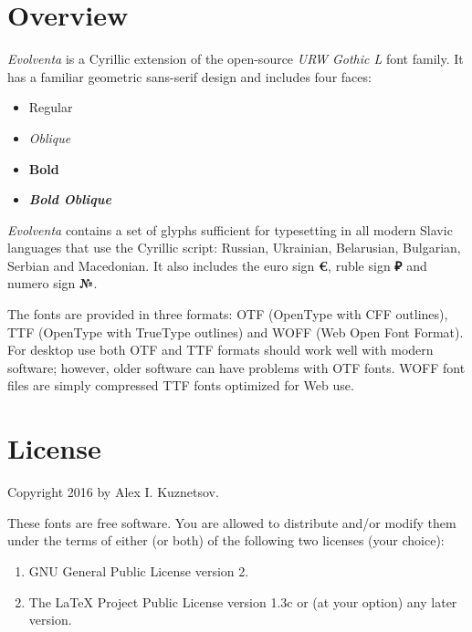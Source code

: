 \documentclass[a4paper,12pt,oneside,extrafontsizes]{memoir}
\begin{document}


\chapter{Overview}

\emph{Evolventa} is a Cyrillic extension of the open-source \emph{URW Gothic L} font family. It has a familiar geometric sans-serif design and includes four faces:

\begin{itemize}
	\item Regular
	\item \textit{Oblique}
	\item \textbf{Bold}
	\item \textbf{\textit{Bold Oblique}}
\end{itemize}

\emph{Evolventa} contains a set of glyphs sufficient for typesetting in all modern Slavic languages that use the Cyrillic script: Russian, Ukrainian, Belarusian, Bulgarian, Serbian and Macedonian. It also includes the euro sign \textbf{€}, ruble sign \textbf{₽} and numero sign \textbf{№}.

The fonts are provided in three formats: OTF (OpenType with CFF outlines), TTF (OpenType with TrueType outlines) and WOFF (Web Open Font Format). For desktop use both OTF and TTF formats should work well with modern software; however, older software can have problems with OTF fonts. WOFF font files are simply compressed TTF fonts optimized for Web use.

\chapter{License}

Copyright \textcopyright{} 2016 by Alex I. Kuznetsov.

\vspace{0.5\onelineskip}

These fonts are free software. You are allowed to distribute and/or modify them under the terms of either (or both) of the following two licenses (your choice):

\begin{enumerate}
	\item GNU General Public License version 2.
	\item The LaTeX Project Public License version 1.3c or (at your option) any later version.
\end{enumerate}
\end{document}
